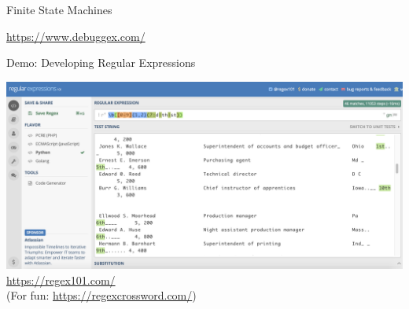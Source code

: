 \documentclass[10pt]{beamer}
\begin{document}
\begin{frame}{Finite State Machines}
  \begin{center}
  \end{center}
  \begin{center}
    \textcolor{blue}{\url{https://www.debuggex.com/}}
  \end{center}
\end{frame}

\begin{frame}[fragile]{Demo: Developing Regular Expressions}

\begin{center}
  \includegraphics[scale=0.25]{figures/regex101-screenshot.png}
  \\ \vspace{1em}
  \textcolor{blue}{\url{https://regex101.com/}}
  \\
  (For fun: \textcolor{blue}{\url{https://regexcrossword.com/}})
\end{center}

\end{frame}
\end{document}
